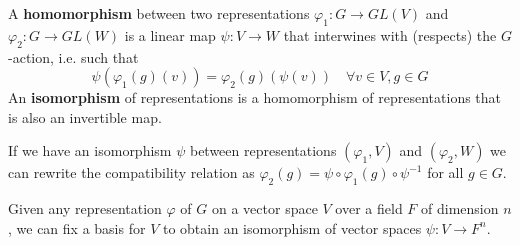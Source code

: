 \begin{defn}
A \textbf{homomorphism} between two representations $\varphi_1 \colon G \to GL(V)$ and $\varphi_2 \colon G \to GL(W)$ is a linear map $\psi \colon V \to W$ that interwines with (respects) the $G$-action, i.e. such that \[ \psi ( \varphi_1 (g)(v)) = \varphi_2(g) (\psi(v)) \quad \forall v \in V, g \in G \]  An \textbf{isomorphism} of representations is a homomorphism of representations that is also an invertible map.
\end{defn}
\begin{note}
If we have an isomorphism $\psi$ between representations $(\varphi_1, V)$ and $(\varphi_2, W)$ we can rewrite the compatibility relation as $\varphi_2(g) = \psi \circ \varphi_1(g) \circ \psi^{-1}$ for all $g \in G$.
\end{note}
\begin{note}
Given any representation $\varphi$ of $G$ on a vector space $V$ over a field $F$ of dimension $n$, we can fix a basis for $V$ to obtain an isomorphism of vector spaces $\psi \colon V \to F^n$.   %
\end{note}


